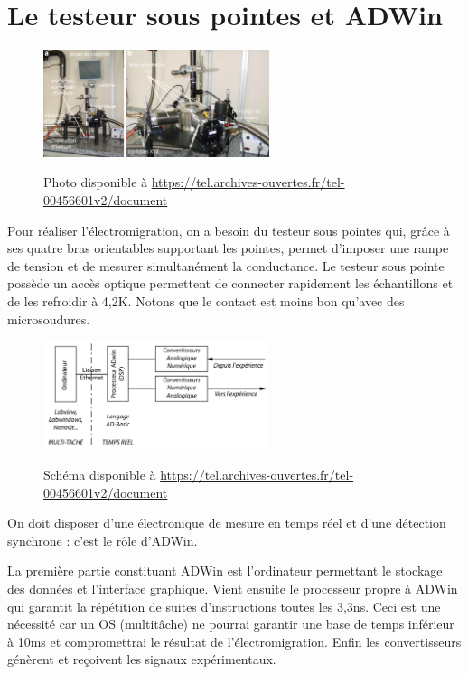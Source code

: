 \section{Le testeur sous pointes et ADWin}
\begin{figure}[h]
    \begin{center}
        \includegraphics[width=250px]{Images/ADWin_avec_legendes}
        \caption{}
        \label{fig:}
        Photo disponible à \url{https://tel.archives-ouvertes.fr/tel-00456601v2/document}
    \end{center}
\end{figure}
Pour réaliser l'électromigration, on a besoin du testeur sous pointes qui, grâce à ses quatre bras orientables supportant les pointes, permet d'imposer une rampe de tension et de mesurer simultanément la conductance. Le testeur sous pointe possède un accès optique permettent de connecter rapidement les échantillons et de les refroidir à 4,2K. Notons que le contact est moins bon qu'avec des microsoudures. 
\begin{figure}[h]
    \begin{center}
        \includegraphics[width=250px]{Images/ADWin_schema}
        \caption{}
        \label{fig:}
        Schéma disponible à \url{https://tel.archives-ouvertes.fr/tel-00456601v2/document}
    \end{center}
\end{figure}

On doit disposer d'une électronique de mesure en temps réel et d'une détection synchrone : c'est le rôle d'ADWin.

La première partie constituant ADWin est l'ordinateur permettant le stockage des données et l'interface graphique. Vient ensuite le processeur propre à ADWin qui garantit la répétition de suites d'instructions toutes les 3,3ns. Ceci est une nécessité car un OS (multitâche) ne pourrai garantir une base de temps inférieur à 10ms et compromettrai le résultat de l'électromigration. Enfin les convertisseurs génèrent et reçoivent les signaux expérimentaux.

